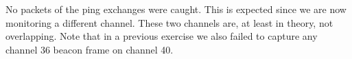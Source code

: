 No packets of the ping exchanges were caught. This is expected since we are now monitoring a different channel. These two channels are, at least in theory, not overlapping. Note that in a previous exercise we also failed to capture any channel 36 beacon frame on channel 40.
